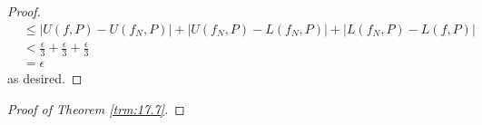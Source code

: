 \documentclass[../main.tex]{subfiles}
\begin{document}
\begin{theorem}
\begin{lemma*}
\begin{proof}
\begin{align*}
                &\leq |U(f,P)-U(f_N,P)|+|U(f_N,P)-L(f_N,P)|+|L(f_N,P)-L(f,P)|\\
                &< \frac{\epsilon}{3}+\frac{\epsilon}{3}+\frac{\epsilon}{3}\\
                &= \epsilon
            \end{align*}
            as desired.
        \end{proof}
    \end{lemma*}
    \begin{proof}[Proof of Theorem \ref{trm:17.7}]

\end{proof}
\end{theorem}
\end{document}
